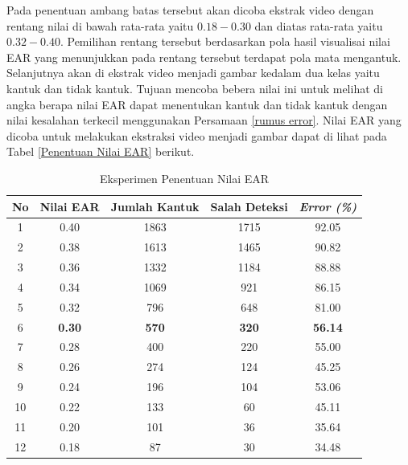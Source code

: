 \begin{table}[H]
            Pada penentuan ambang batas tersebut akan dicoba ekstrak video dengan rentang nilai di bawah rata-rata yaitu $0.18 - 0.30$ dan diatas rata-rata yaitu $0.32 - 0.40$. Pemilihan rentang tersebut berdasarkan pola hasil visualisai nilai EAR yang menunjukkan pada rentang tersebut terdapat pola mata mengantuk. Selanjutnya akan di ekstrak video menjadi gambar kedalam dua kelas yaitu kantuk dan tidak kantuk. Tujuan mencoba bebera nilai ini untuk melihat di angka berapa nilai EAR dapat menentukan kantuk dan tidak kantuk dengan nilai kesalahan terkecil menggunakan Persamaan \ref{rumus error}. Nilai EAR yang dicoba untuk melakukan ekstraksi video menjadi gambar dapat di lihat pada Tabel \ref{Penentuan Nilai EAR} berikut.\\


            \begin{table}[h]
            \centering
            \caption{Eksperimen Penentuan Nilai EAR}
            \begin{tabular}{ccccc}
                \toprule
                 \textbf{No} &\textbf{Nilai EAR} & \textbf{Jumlah Kantuk} & \textbf{Salah Deteksi} & \textbf{\textit{Error (\%)}} \\
                \midrule
                   
                      
                         1 & 0.40 & 1863 & 1715 & 92.05 \\
                         2 &  0.38 & 1613 & 1465 & 90.82 \\
                         3 & 0.36 & 1332 & 1184 & 88.88 \\
                         4 &  0.34 & 1069 & 921  & 86.15 \\
                         5 &  0.32 & 796  & 648  & 81.00 \\
                         6 & \textbf{0.30} &\textbf{ 570} & \textbf{320} & \textbf{56.14} \\
                         7 & 0.28 & 400 & 220 & 55.00 \\
                         8 &  0.26 & 274 & 124 & 45.25 \\
                         9 &  0.24 & 196 & 104 & 53.06 \\
                         10 &  0.22 & 133 & 60& 45.11 \\
                         11 &  0.20 & 101 & 36  & 35.64 \\
                         12 &  0.18 & 87  & 30  & 34.48\\
    

\end{tabular}
\end{table}
\end{table}
